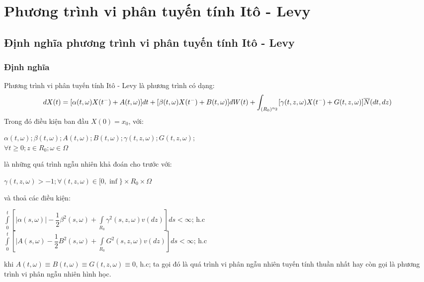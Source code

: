 \documentclass[14pt,a4paper]{article}
\numberwithin{equation}{section}
\begin{document}
\section{Phương trình vi phân tuyến tính Itô - Levy}
\subsection{Định nghĩa phương trình vi phân tuyến tính Itô - Levy}
\subsubsection{Định nghĩa}
Phương trình vi phân tuyến tính Itô - Levy là phương trình có dạng:
\begin{dmath}\label{eq:dn1}
	dX(t)=[\alpha(t,\omega)X(t^-)+A(t,\omega)]dt+[\beta(t,\omega)X(t^-)+B(t,\omega)]dW(t)\\
	+\int_{(R_0)^{n_2}}[\gamma(t,z,\omega)X(t^-)+G(t,z,\omega)]\overline{N}(dt,dz)
\end{dmath}
Trong đó điều kiện ban đầu $X(0)=x_0$, với:
\begin{center}
$\alpha(t,\omega); \beta(t,\omega);A(t,\omega);B(t,\omega);\gamma(t,z,\omega);G(t,z,\omega);$\\
$\forall t \geqslant 0; z \in R_0; \omega \in \Omega$
\end{center}
là những quá trình ngẫu nhiên khả đoán cho trước với:
\begin{center}
	$\gamma(t,z,\omega)>-1;\forall (t,z,\omega)\in [0,\inf\}\times R_0 \times \Omega$
\end{center}
và thoả các điều kiện:
\begin{center}
	$\int\limits_{0}^t[|\alpha(s,\omega)|-\dfrac{1}{2}\beta^2(s,\omega)+\int\limits_{R_0} \gamma^2(s,z,\omega)v(dz)]ds<\infty$; h.c\\
	$\int\limits_{0}^t [|A(s,\omega)-\dfrac{1}{2}B^2(s,\omega)+\int\limits_{R_0}G^2(s,z,\omega)v(dz)]ds<\infty$; h.c
\end{center}
khi $A(t,\omega)\equiv B(t,\omega)\equiv G(t,z,\omega)\equiv 0$, h.c; ta gọi đó là quá trình vi phân ngẫu nhiên tuyến tính thuần nhất hay còn gọi là phương trình vi phân ngẫu nhiên hình học.\\
\end{document}
